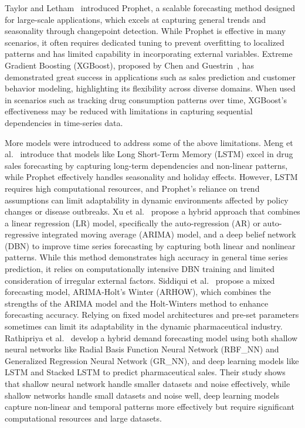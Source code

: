 \documentclass[journal]{IEEEtran}
\begin{document}
Taylor and Letham~\cite{taylor2018forecasting} introduced Prophet, a scalable forecasting method designed for large-scale applications, which excels at capturing general trends and seasonality through changepoint detection. While Prophet is effective in many scenarios, it often requires dedicated tuning to prevent overfitting to localized patterns and has limited capability in incorporating external variables. Extreme Gradient Boosting (XGBoost), proposed by Chen and Guestrin~\cite{chen2016xgboost}, has demonstrated great success in applications such as sales prediction and customer behavior modeling, highlighting its flexibility across diverse domains. When used in scenarios such as tracking drug consumption patterns over time, XGBoost's effectiveness may be reduced with limitations in capturing sequential dependencies in time-series data.

More models were introduced to address some of the above limitations. Meng et al.~\cite{meng2021comparative} introduce that models like Long Short-Term Memory (LSTM) excel in drug sales forecasting by capturing long-term dependencies and non-linear patterns, while Prophet effectively handles seasonality and holiday effects. However, LSTM requires high computational resources, and Prophet's reliance on trend assumptions can limit adaptability in dynamic environments affected by policy changes or disease outbreaks. Xu et al.~\cite{xu2019hybrid} propose a hybrid approach that combines a linear regression (LR) model, specifically the auto-regression (AR) or auto-regressive integrated moving average (ARIMA) model, and a deep belief network (DBN) to improve time series forecasting by capturing both linear and nonlinear patterns. While this method demonstrates high accuracy in general time series prediction, it relies on computationally intensive DBN training and limited consideration of irregular external factors. Siddiqui et al.~\cite{siddiqui2021hybrid} propose a mixed forecasting model, ARIMA-Holt’s Winter (ARHOW), which combines the strengths of the ARIMA model and the Holt-Winters method to enhance forecasting accuracy. Relying on fixed model architectures and pre-set parameters sometimes can limit its adaptability in the dynamic pharmaceutical industry. Rathipriya et al.~\cite{rathipriya2022pharma} develop a hybrid demand forecasting model using both shallow neural networks like Radial Basis Function Neural Network (RBF\_NN) and Generalized Regression Neural Network (GR\_NN), and deep learning models like LSTM and Stacked LSTM to predict pharmaceutical sales. Their study shows that shallow neural network handle smaller datasets and noise effectively, while shallow networks handle small datasets and noise well, deep learning models capture non-linear and temporal patterns more effectively but require significant computational resources and large datasets.
\end{document}
